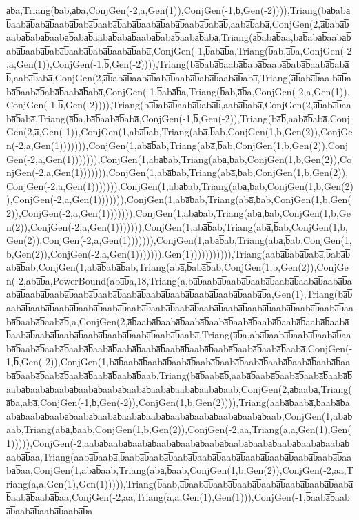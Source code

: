a̅b̅a,Triang(b̅ab,a̅b̅a,ConjGen(-2,a,Gen(1)),ConjGen(-1,b̅,Gen(-2)))),Triang(ba̅b̅aba̅b̅aaba̅b̅aba̅b̅aaba̅b̅aba̅b̅aaba̅b̅aba̅b̅aaba̅b̅aba̅b̅aaba̅b̅aba̅b̅,aaba̅b̅aba̅,ConjGen(2,a̅b̅aba̅b̅aaba̅b̅aba̅b̅aaba̅b̅aba̅b̅aaba̅b̅aba̅b̅aaba̅b̅aba̅b̅aaba̅b̅aba̅,Triang(a̅b̅aba̅b̅aa,ba̅b̅aba̅b̅aaba̅b̅aba̅b̅aaba̅b̅aba̅b̅aaba̅b̅aba̅b̅aaba̅b̅aba̅,ConjGen(-1,b̅aba̅b̅a,Triang(b̅ab,a̅b̅a,ConjGen(-2,a,Gen(1)),ConjGen(-1,b̅,Gen(-2)))),Triang(ba̅b̅aba̅b̅aaba̅b̅aba̅b̅aaba̅b̅aba̅b̅aaba̅b̅aba̅b̅,aaba̅b̅aba̅,ConjGen(2,a̅b̅aba̅b̅aaba̅b̅aba̅b̅aaba̅b̅aba̅b̅aaba̅b̅aba̅,Triang(a̅b̅aba̅b̅aa,ba̅b̅aba̅b̅aaba̅b̅aba̅b̅aaba̅b̅aba̅,ConjGen(-1,b̅aba̅b̅a,Triang(b̅ab,a̅b̅a,ConjGen(-2,a,Gen(1)),ConjGen(-1,b̅,Gen(-2)))),Triang(ba̅b̅aba̅b̅aaba̅b̅aba̅b̅,aaba̅b̅aba̅,ConjGen(2,a̅b̅aba̅b̅aaba̅b̅aba̅,Triang(a̅b̅a,ba̅b̅aaba̅b̅aba̅,ConjGen(-1,b̅,Gen(-2)),Triang(ba̅b̅,aaba̅b̅aba̅,ConjGen(2,a̅,Gen(-1)),ConjGen(1,aba̅b̅ab,Triang(aba̅,b̅ab,ConjGen(1,b,Gen(2)),ConjGen(-2,a,Gen(1))))))),ConjGen(1,aba̅b̅ab,Triang(aba̅,b̅ab,ConjGen(1,b,Gen(2)),ConjGen(-2,a,Gen(1))))))),ConjGen(1,aba̅b̅ab,Triang(aba̅,b̅ab,ConjGen(1,b,Gen(2)),ConjGen(-2,a,Gen(1))))))),ConjGen(1,aba̅b̅ab,Triang(aba̅,b̅ab,ConjGen(1,b,Gen(2)),ConjGen(-2,a,Gen(1))))))),ConjGen(1,aba̅b̅ab,Triang(aba̅,b̅ab,ConjGen(1,b,Gen(2)),ConjGen(-2,a,Gen(1))))))),ConjGen(1,aba̅b̅ab,Triang(aba̅,b̅ab,ConjGen(1,b,Gen(2)),ConjGen(-2,a,Gen(1))))))),ConjGen(1,aba̅b̅ab,Triang(aba̅,b̅ab,ConjGen(1,b,Gen(2)),ConjGen(-2,a,Gen(1))))))),ConjGen(1,aba̅b̅ab,Triang(aba̅,b̅ab,ConjGen(1,b,Gen(2)),ConjGen(-2,a,Gen(1))))))),ConjGen(1,aba̅b̅ab,Triang(aba̅,b̅ab,ConjGen(1,b,Gen(2)),ConjGen(-2,a,Gen(1))))))),Gen(1))))))))))),Triang(aaba̅b̅aba̅b̅aba̅,b̅aba̅b̅aba̅b̅ab,ConjGen(1,aba̅b̅aba̅b̅ab,Triang(aba̅,b̅aba̅b̅ab,ConjGen(1,b,Gen(2)),ConjGen(-2,aba̅b̅a,PowerBound(aba̅b̅a,18,Triang(a,ba̅b̅aaba̅b̅aaba̅b̅aaba̅b̅aaba̅b̅aaba̅b̅aaba̅b̅aaba̅b̅aaba̅b̅aaba̅b̅aaba̅b̅aaba̅b̅aaba̅b̅aaba̅b̅aaba̅b̅aaba̅b̅aaba̅b̅aaba̅b̅a,Gen(1),Triang(ba̅b̅aaba̅b̅aaba̅b̅aaba̅b̅aaba̅b̅aaba̅b̅aaba̅b̅aaba̅b̅aaba̅b̅aaba̅b̅aaba̅b̅aaba̅b̅aaba̅b̅aaba̅b̅aaba̅b̅aaba̅b̅aaba̅b̅aaba̅b̅,a,ConjGen(2,a̅b̅aaba̅b̅aaba̅b̅aaba̅b̅aaba̅b̅aaba̅b̅aaba̅b̅aaba̅b̅aaba̅b̅aaba̅b̅aaba̅b̅aaba̅b̅aaba̅b̅aaba̅b̅aaba̅b̅aaba̅b̅aaba̅b̅aaba̅,Triang(a̅b̅a,aba̅b̅aaba̅b̅aaba̅b̅aaba̅b̅aaba̅b̅aaba̅b̅aaba̅b̅aaba̅b̅aaba̅b̅aaba̅b̅aaba̅b̅aaba̅b̅aaba̅b̅aaba̅b̅aaba̅b̅aaba̅b̅aaba̅,ConjGen(-1,b̅,Gen(-2)),ConjGen(1,ba̅b̅aaba̅b̅aaba̅b̅aaba̅b̅aaba̅b̅aaba̅b̅aaba̅b̅aaba̅b̅aaba̅b̅aaba̅b̅aaba̅b̅aaba̅b̅aaba̅b̅aaba̅b̅aaba̅b̅aaba̅b̅aab,Triang(ba̅b̅aaba̅b̅,aaba̅b̅aaba̅b̅aaba̅b̅aaba̅b̅aaba̅b̅aaba̅b̅aaba̅b̅aaba̅b̅aaba̅b̅aaba̅b̅aaba̅b̅aaba̅b̅aaba̅b̅aaba̅b̅aab,ConjGen(2,a̅b̅aaba̅,Triang(a̅b̅a,aba̅,ConjGen(-1,b̅,Gen(-2)),ConjGen(1,b,Gen(2)))),Triang(aaba̅b̅aaba̅,b̅aaba̅b̅aaba̅b̅aaba̅b̅aaba̅b̅aaba̅b̅aaba̅b̅aaba̅b̅aaba̅b̅aaba̅b̅aaba̅b̅aaba̅b̅aaba̅b̅aab,ConjGen(1,aba̅b̅aab,Triang(aba̅,b̅aab,ConjGen(1,b,Gen(2)),ConjGen(-2,aa,Triang(a,a,Gen(1),Gen(1))))),ConjGen(-2,aaba̅b̅aaba̅b̅aaba̅b̅aaba̅b̅aaba̅b̅aaba̅b̅aaba̅b̅aaba̅b̅aaba̅b̅aaba̅b̅aaba̅b̅aaba̅b̅aa,Triang(aaba̅b̅aaba̅,b̅aaba̅b̅aaba̅b̅aaba̅b̅aaba̅b̅aaba̅b̅aaba̅b̅aaba̅b̅aaba̅b̅aaba̅b̅aaba̅b̅aa,ConjGen(1,aba̅b̅aab,Triang(aba̅,b̅aab,ConjGen(1,b,Gen(2)),ConjGen(-2,aa,Triang(a,a,Gen(1),Gen(1))))),Triang(b̅aab,a̅b̅aaba̅b̅aaba̅b̅aaba̅b̅aaba̅b̅aaba̅b̅aaba̅b̅aaba̅b̅aaba̅b̅aaba̅b̅aa,ConjGen(-2,aa,Triang(a,a,Gen(1),Gen(1))),ConjGen(-1,b̅aaba̅b̅aaba̅b̅aaba̅b̅aaba̅b̅aaba̅b̅a